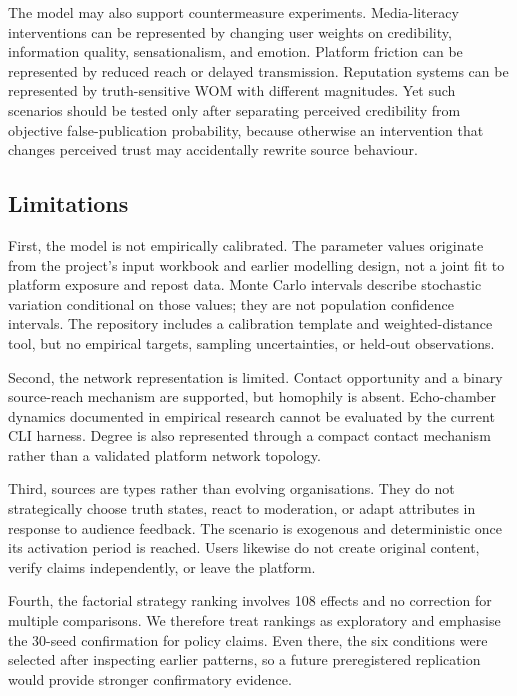 The model may also support countermeasure experiments. Media-literacy interventions can be represented by changing user weights on credibility, information quality, sensationalism, and emotion. Platform friction can be represented by reduced reach or delayed transmission. Reputation systems can be represented by truth-sensitive WOM with different magnitudes. Yet such scenarios should be tested only after separating perceived credibility from objective false-publication probability, because otherwise an intervention that changes perceived trust may accidentally rewrite source behaviour.

\subsection{Limitations}

First, the model is not empirically calibrated. The parameter values originate from the project's input workbook and earlier modelling design, not a joint fit to platform exposure and repost data. Monte Carlo intervals describe stochastic variation conditional on those values; they are not population confidence intervals. The repository includes a calibration template and weighted-distance tool, but no empirical targets, sampling uncertainties, or held-out observations.

Second, the network representation is limited. Contact opportunity and a binary source-reach mechanism are supported, but homophily is absent. Echo-chamber dynamics documented in empirical research \citep{delvicario2016} cannot be evaluated by the current CLI harness. Degree is also represented through a compact contact mechanism rather than a validated platform network topology.

Third, sources are types rather than evolving organisations. They do not strategically choose truth states, react to moderation, or adapt attributes in response to audience feedback. The scenario is exogenous and deterministic once its activation period is reached. Users likewise do not create original content, verify claims independently, or leave the platform.

Fourth, the factorial strategy ranking involves 108 effects and no correction for multiple comparisons. We therefore treat rankings as exploratory and emphasise the 30-seed confirmation for policy claims. Even there, the six conditions were selected after inspecting earlier patterns, so a future preregistered replication would provide stronger confirmatory evidence.

